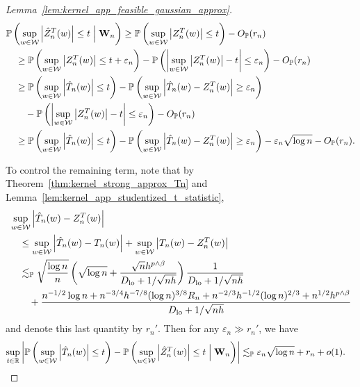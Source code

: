 \begin{proof}[Lemma~\ref{lem:kernel_app_feasible_gaussian_approx}]
\begin{align*}
    &\mathbb{P}\left(
      \sup_{w \in \mathcal{W}}
      \left|
      \hat Z_n^T(w)
      \right|
      \leq t
      \Bigm\vert \mathbf{W}_n
    \right)
    \geq
    \mathbb{P}\left(
      \sup_{w \in \mathcal{W}}
      \left|
      Z_n^T(w)
      \right|
      \leq t
    \right)
    -
    O_{\mathbb{P}}(r_n) \\
    &\quad\geq
    \mathbb{P}\left(
      \sup_{w \in \mathcal{W}}
      \left|
      Z_n^T(w)
      \right|
      \leq t + \varepsilon_n
    \right)
    -
    \mathbb{P}\left(
      \left|
      \sup_{w \in \mathcal{W}}
      \big|
      Z_n^T(w)
      \big|
      -t
      \right|
      \leq \varepsilon_n
    \right)
    -
    O_{\mathbb{P}}(r_n) \\
    &\quad\geq
    \mathbb{P}\left(
      \sup_{w \in \mathcal{W}}
      \left| \hat T_n(w) \right|
      \leq t
    \right)
    -
    \mathbb{P}\left(
      \sup_{w \in \mathcal{W}}
      \left| \hat T_n(w) - Z_n^T(w) \right|
      \geq \varepsilon_n
    \right) \\
    &\qquad-
    \mathbb{P}\left(
      \left|
      \sup_{w \in \mathcal{W}}
      \big|
      Z_n^T(w)
      \big|
      -t
      \right|
      \leq \varepsilon_n
    \right)
    -
    O_{\mathbb{P}}(r_n) \\
    &\quad\geq
    \mathbb{P}\left(
      \sup_{w \in \mathcal{W}}
      \left| \hat T_n(w) \right|
      \leq t
    \right)
    -
    \mathbb{P}\left(
      \sup_{w \in \mathcal{W}}
      \left| \hat T_n(w) - Z_n^T(w) \right|
      \geq \varepsilon_n
    \right)
    - \varepsilon_n \sqrt{\log n}
    - O_{\mathbb{P}}(r_n).
  \end{align*}


  To control the remaining term,
  note that by
  Theorem~\ref{thm:kernel_strong_approx_Tn}
  and Lemma~\ref{lem:kernel_app_studentized_t_statistic},
  \begin{align*}
    &\sup_{w \in \mathcal{W}}
    \left| \hat T_n(w) - Z_n^T(w) \right| \\
    &\quad\leq
    \sup_{w \in \mathcal{W}}
    \left| \hat T_n(w) - T_n(w) \right|
    + \sup_{w \in \mathcal{W}}
    \left| T_n(w) - Z_n^T(w) \right| \\
    &\quad\lesssim_{\mathbb{P}}
    \sqrt{\frac{\log n}{n}}
    \left(
      \sqrt{\log n} + \frac{\sqrt n h^{p \wedge \beta}}
      {D_{\textup{lo}} + 1/\sqrt{n h}}
    \right)
    \frac{1}{D_{\textup{lo}} + 1/\sqrt{n h}} \\
    &\qquad+
    \frac{
      n^{-1/2} \log n
      + n^{-3/4} h^{-7/8} (\log n)^{3/8} R_n
      + n^{-2/3} h^{-1/2} (\log n)^{2/3}
    + n^{1/2} h^{p \wedge \beta}}
    {D_{\textup{lo}} + 1/\sqrt{n h}}
  \end{align*}
  and denote this last quantity by $r_n'$.
  Then for any $\varepsilon_n \gg r_n'$,
  we have
  \begin{align*}
    \sup_{t \in \mathbb{R}}
    \left|
    \mathbb{P}\left(
      \sup_{w \in \mathcal{W}}
      \left| \hat T_n(w) \right|
      \leq t
    \right)
    - \mathbb{P}\left(
      \sup_{w \in \mathcal{W}}
      \left|
      \hat Z_n^T(w)
      \right|
      \leq t
      \Bigm\vert \mathbf{W}_n
    \right)
    \right|
    &\lesssim_{\mathbb{P}}
    \varepsilon_n \sqrt{\log n}
    + r_n
    + o(1).
  \end{align*}


\end{proof}
